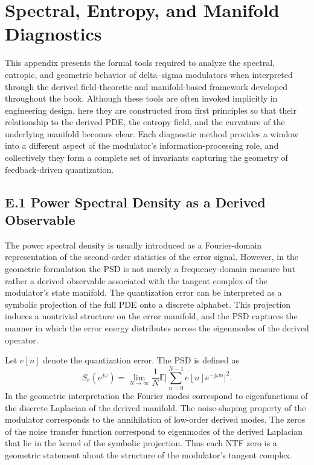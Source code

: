
\chapter{Spectral, Entropy, and Manifold Diagnostics}

This appendix presents the formal tools required to analyze the spectral, entropic, and geometric behavior of delta–sigma modulators when interpreted through the derived field-theoretic and manifold-based framework developed throughout the book. Although these tools are often invoked implicitly in engineering design, here they are constructed from first principles so that their relationship to the derived PDE, the entropy field, and the curvature of the underlying manifold becomes clear. Each diagnostic method provides a window into a different aspect of the modulator’s information-processing role, and collectively they form a complete set of invariants capturing the geometry of feedback-driven quantization.

\section{E.1 Power Spectral Density as a Derived Observable}

The power spectral density is usually introduced as a Fourier-domain representation of the second-order statistics of the error signal. However, in the geometric formulation the PSD is not merely a frequency-domain measure but rather a derived observable associated with the tangent complex of the modulator’s state manifold. The quantization error can be interpreted as a symbolic projection of the full PDE onto a discrete alphabet. This projection induces a nontrivial structure on the error manifold, and the PSD captures the manner in which the error energy distributes across the eigenmodes of the derived operator.

Let \(e[n]\) denote the quantization error. The PSD is defined as
\[
S_{e}(e^{j\omega}) = \lim_{N\to\infty} \frac{1}{N} \mathbb{E}\bigl|\sum_{n=0}^{N-1} e[n] e^{-j\omega n}\bigr|^{2}.
\]
In the geometric interpretation the Fourier modes correspond to eigenfunctions of the discrete Laplacian of the derived manifold. The noise-shaping property of the modulator corresponds to the annihilation of low-order derived modes. The zeros of the noise transfer function correspond to eigenmodes of the derived Laplacian that lie in the kernel of the symbolic projection. Thus each NTF zero is a geometric statement about the structure of the modulator’s tangent complex.


